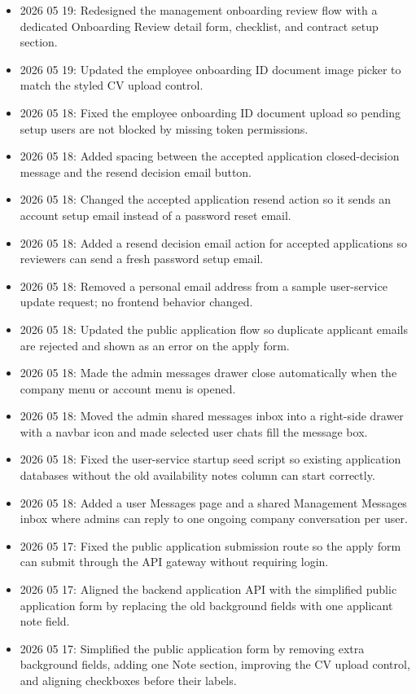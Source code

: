 \documentclass[11pt]{article}
\begin{document}
\begin{itemize}
    \item 2026 05 19: Redesigned the management onboarding review flow with a dedicated Onboarding Review detail form, checklist, and contract setup section.
    \item 2026 05 19: Updated the employee onboarding ID document image picker to match the styled CV upload control.
    \item 2026 05 18: Fixed the employee onboarding ID document upload so pending setup users are not blocked by missing token permissions.
    \item 2026 05 18: Added spacing between the accepted application closed-decision message and the resend decision email button.
    \item 2026 05 18: Changed the accepted application resend action so it sends an account setup email instead of a password reset email.
    \item 2026 05 18: Added a resend decision email action for accepted applications so reviewers can send a fresh password setup email.
    \item 2026 05 18: Removed a personal email address from a sample user-service update request; no frontend behavior changed.
    \item 2026 05 18: Updated the public application flow so duplicate applicant emails are rejected and shown as an error on the apply form.
    \item 2026 05 18: Made the admin messages drawer close automatically when the company menu or account menu is opened.
    \item 2026 05 18: Moved the admin shared messages inbox into a right-side drawer with a navbar icon and made selected user chats fill the message box.
    \item 2026 05 18: Fixed the user-service startup seed script so existing application databases without the old availability notes column can start correctly.
    \item 2026 05 18: Added a user Messages page and a shared Management Messages inbox where admins can reply to one ongoing company conversation per user.
    \item 2026 05 17: Fixed the public application submission route so the apply form can submit through the API gateway without requiring login.
    \item 2026 05 17: Aligned the backend application API with the simplified public application form by replacing the old background fields with one applicant note field.
    \item 2026 05 17: Simplified the public application form by removing extra background fields, adding one Note section, improving the CV upload control, and aligning checkboxes before their labels.

\end{itemize}
\end{document}
